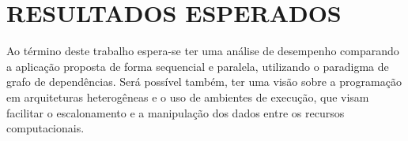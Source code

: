 
\chapter{RESULTADOS ESPERADOS}
\label{chap:resultados-esperados}

Ao término deste trabalho espera-se ter uma análise de desempenho comparando a aplicação proposta de forma sequencial e paralela,
utilizando o paradigma de grafo de dependências.
Será possível também, ter uma visão sobre a programação em arquiteturas heterogêneas e o uso de ambientes de execução,
que visam facilitar o escalonamento e a manipulação dos dados entre os recursos computacionais.